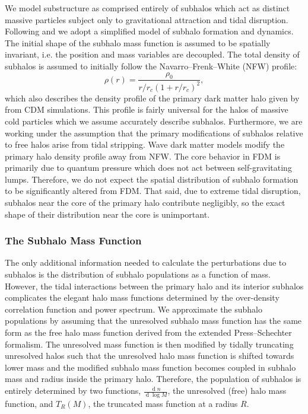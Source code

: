 \documentclass[usenatbib]{mnras}
\renewcommand{\d}[1]{\! \mathrm{d}#1 \:}
\renewcommand{\d}[1]{\ensuremath{\operatorname{d}\!{#1}}}
\begin{document}
We model substructure as comprised entirely of subhalos which act as distinct massive particles subject only to gravitational attraction and tidal disruption. Following \citet{tidal_limit} and \cite{unified_model} we adopt a
simplified model of subhalo
formation and dynamics. The initial shape of
the subhalo mass function is assumed to
be spatially invariant, i.e. the position
and mass variables are decoupled. The
total density of subhalos is assumed to initially
follow the Navarro--Frenk--White (NFW) profile:
\begin{equation}
\rho(r) = \frac{\rho_0}{r/r_c (1+r/r_c)^2},
\end{equation} which also
describes the density profile of the
primary dark matter halo given by \citet{structure} from CDM simulations. This profile is fairly universal for the halos of massive cold particles which we assume accurately describe subhalos. Furthermore, we are working under the assumption that the primary modifications of subhalos relative to free halos arise from tidal stripping. Wave dark matter models modify the primary halo density profile away from NFW. The core behavior in FDM is primarily due to quantum pressure which does not act between self-gravitating lumps. Therefore, we do not expect the spatial distribution of subhalo formation to be significantly altered from FDM. That said, due to extreme tidal disruption, subhalos near the core of the primary halo contribute negligibly, so the exact shape of their distribution near the core is unimportant.  

\subsubsection{The Subhalo Mass Function}

The only additional information needed to calculate the perturbations due to subhalos is the distribution of subhalo populations as a function of mass. However, the tidal interactions between the primary halo and its interior subhalos complicates the elegant halo mass functions determined by the over-density correlation function and power spectrum. We approximate the subhalo populations by assuming that the unresolved subhalo mass function has the same form as the free halo mass function derived from the extended Press--Schechter formalism. The unresolved mass function is then modified by tidally truncating unresolved halos such that the unresolved halo mass function is shifted towards lower mass and the modified subhalo mass function becomes coupled in subhalo mass and radius inside the primary halo. Therefore, the population of subhalos is entirely determined by two functions, $\frac{\d{n}}{\d{\log{M}}}$, the unresolved (free) halo mass function, and $T_R(M)$, the truncated mass function at a radius $R$. 
\end{document}
